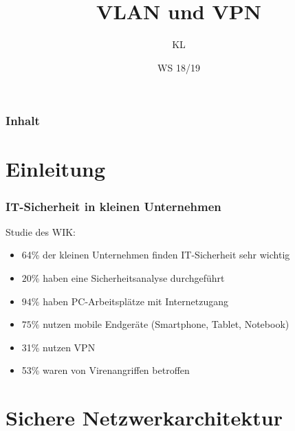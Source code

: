 \documentclass[hyperref={pdfpagelabels=false},xcolor=dvipsnames]{beamer}
\title{VLAN und VPN}
\author{KL}
\institute{Fernuniversität Hagen}
\date{WS 18/19}
\newcommand*\mi{ \item[\color{gray}\scalebox{1.2}{\textbullet}]}
\begin{document}
\begin{frame}[plain]
	\titlepage
\end{frame}
\begin{frame}[plain]

	\frametitle{Inhalt}
	\tableofcontents	
\end{frame}
\section{Einleitung}

\begin{frame}
	\frametitle{IT-Sicherheit in kleinen Unternehmen} Studie des WIK: 	
	\begin{itemize}
		\mi 64\% der kleinen Unternehmen finden IT-Sicherheit sehr wichtig
		\mi $20\%$ haben eine Sicherheitsanalyse durchgeführt
		\mi $94\%$ haben PC-Arbeitsplätze mit Internetzugang
		\mi $75\%$ nutzen mobile Endgeräte (Smartphone, Tablet, Notebook)
		\mi 31\% nutzen VPN
		\mi 53\%	waren von Virenangriffen betroffen
	\end{itemize}
	
\end{frame}
\section{Sichere Netzwerkarchitektur}
\begin{frame}
\sectionpage	
\end{frame}
\end{document}
